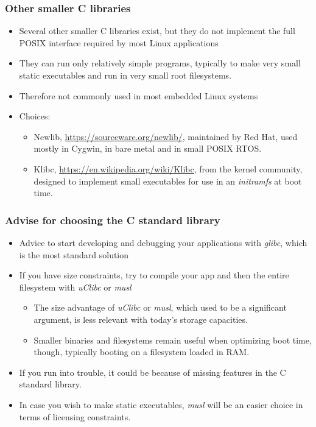 \begin{frame}
  \frametitle{Other smaller C libraries}
  \begin{itemize}
  \item Several other smaller C libraries exist, but they do not
    implement the full POSIX interface required by most Linux
    applications
  \item They can run only relatively simple programs, typically to
    make very small static executables and run in very small root
    filesystems.
  \item Therefore not commonly used in most embedded Linux systems
  \item Choices:
    \begin{itemize}
    \item Newlib, \url{https://sourceware.org/newlib/}, maintained by
      Red Hat, used mostly in Cygwin, in bare metal and in small POSIX
      RTOS.
    \item Klibc, \url{https://en.wikipedia.org/wiki/Klibc}, from the
      kernel community, designed to implement small executables for
      use in an {\em initramfs} at boot time.
    \end{itemize}
  \end{itemize}
\end{frame}

\begin{frame}
  \frametitle{Advise for choosing the C standard library}
  \begin{itemize}
  \item Advice to start developing and debugging your applications
    with {\em glibc}, which is the most standard solution
  \item If you have size constraints, try to compile your app and then
    the entire filesystem with {\em uClibc} or {\em musl}
    \begin{itemize}
    \item The size advantage of {\em uClibc} or {\em musl}, which used
      to be a significant argument, is less relevant with today's
      storage capacities.
    \item Smaller binaries and filesystems remain useful when optimizing
      boot time, though, typically booting on a filesystem loaded in RAM.
    \end{itemize}
  \item If you run into trouble, it could be because of missing
    features in the C standard library.
  \item In case you wish to make static executables, {\em musl} will
    be an easier choice in terms of licensing constraints.
  \end{itemize}
\end{frame}

